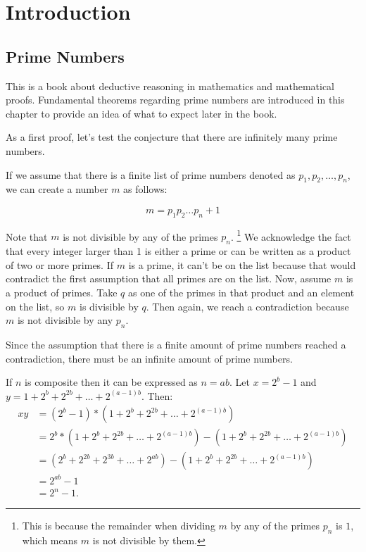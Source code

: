 \chapter{Introduction}

\section{Prime Numbers}
This is a book about deductive reasoning in mathematics and mathematical proofs. 
Fundamental theorems regarding prime numbers are introduced in this chapter to provide an idea of what to expect later in the book.


As a first proof, let's test the conjecture that there are infinitely many prime numbers.

\begin{myproof}
If we assume that there is a finite list of prime numbers denoted as $p_1, p_2, \ldots, p_n$, we can create a number $m$ as follows:

\[
m = p_1p_2 \ldots p_n + 1
\]

Note that $m$ is not divisible by any of the primes $p_n$.
\footnote{This is because the remainder when dividing $m$ by any of the primes $p_n$ is $1$, 
which means $m$ is not divisible by them.}
We acknowledge the fact that every integer larger than 1 is either a prime or can be written as a product of two or more primes. 
If $m$ is a prime, it can't be on the list because that would contradict the first assumption that all primes are on the list. 
Now, assume $m$ is a product of primes. 
Take $q$ as one of the primes in that product and an element on the list, so $m$ is divisible by $q$. 
Then again, we reach a contradiction because $m$ is not divisible by any $p_n$.

Since the assumption that there is a finite amount of prime numbers reached a contradiction, there must be an infinite amount of prime numbers.
\end{myproof}

\begin{myproof}
  If $n$ is composite then it can be expressed as  $n = ab$. 
  Let  $x = 2^b -1$ and  $y = 1 + 2^b + 2^{2b} + \ldots + 2^{(a-1)b}$.
  Then:
\begin{align*}
  xy &= (2^b - 1)*(1 + 2^b + 2^{2b} + \ldots + 2^{(a-1)b})\\
     &= 2^b * (1 + 2^b + 2^{2b} + \ldots + 2^{(a-1)b}) -  (1 + 2^b + 2^{2b} + \ldots + 2^{(a-1)b})\\
     &= (2^b + 2^{2b} + 2^{3b} + \ldots + 2^{ab}) -  (1 + 2^b + 2^{2b} + \ldots + 2^{(a-1)b})\\
     &= 2^{ab} - 1\\
     &= 2^n - 1.  
\end{align*}
\end{myproof}


